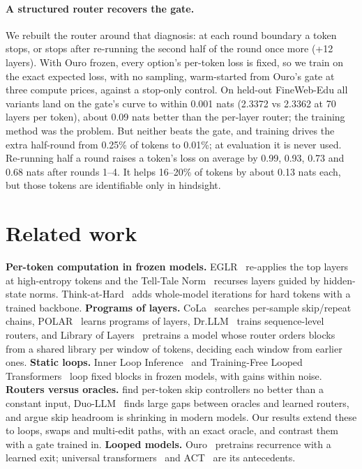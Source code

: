 \documentclass[11pt]{article}
\begin{document}
\paragraph{A structured router recovers the gate.}
We rebuilt the router around that diagnosis: at each round boundary a token stops, or stops after
re-running the second half of the round once more (+12 layers). With Ouro frozen, every option's per-token
loss is fixed, so we train on the exact expected loss, with no sampling, warm-started from Ouro's gate at
three compute prices, against a stop-only control. On held-out FineWeb-Edu all variants land on the gate's
curve to within 0.001 nats (2.3372 vs 2.3362 at 70 layers per token), about 0.09 nats better than the
per-layer router; the training method was the problem. But neither beats the gate, and training drives the
extra half-round from 0.25\% of tokens to 0.01\%; at evaluation it is never used. Re-running half a round
raises a token's loss on average by 0.99, 0.93, 0.73 and 0.68 nats after rounds 1--4. It helps 16--20\% of
tokens by about 0.13 nats each, but those tokens are identifiable only in hindsight.

\section{Related work}
\textbf{Per-token computation in frozen models.} EGLR~\citep{bhattacharjee2026eglr} re-applies the top layers
at high-entropy tokens and the Tell-Tale Norm~\citep{zhang2026telltale} recurses layers guided by hidden-state
norms. Think-at-Hard~\citep{fu2025thinkathard} adds whole-model iterations for hard tokens with a trained
backbone. \textbf{Programs of layers.} CoLa~\citep{li2025cola} searches per-sample skip/repeat chains,
POLAR~\citep{li2026polar} learns programs of layers, Dr.LLM~\citep{heakl2025drllm} trains sequence-level
routers, and Library of Layers~\citep{rahmani2026lol} pretrains a model whose router orders blocks from a
shared library per window of tokens, deciding each window from earlier ones. \textbf{Static loops.} Inner Loop Inference~\citep{lys2026innerloop} and Training-Free Looped
Transformers~\citep{chen2026trainingfreeloop} loop fixed blocks in frozen models, with gains within noise.
\textbf{Routers versus oracles.} \citet{glavas2024dynamic} find per-token skip controllers no better than a
constant input, Duo-LLM~\citep{alizadeh2024duo} finds large gaps between oracles and learned routers, and
\citet{wei2026earlyexit} argue skip headroom is shrinking in modern models. Our results extend these to
loops, swaps and multi-edit paths, with an exact oracle, and contrast them with a gate trained in.
\textbf{Looped models.} Ouro~\citep{zhu2025ouro} pretrains recurrence with a learned exit; universal
transformers~\citep{dehghani2019universal} and ACT~\citep{graves2016act} are its antecedents.
\end{document}
